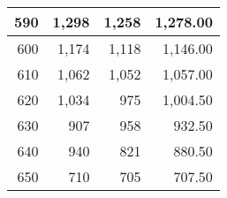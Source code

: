 \begin{longtable}{|r|r|r|r|}
		590                                                                                                                   & 1,298                                                & 1,258                                                & 1,278.00                                                                                                               \\ \hline
		600                                                                                                                   & 1,174                                                & 1,118                                                & 1,146.00                                                                                                               \\ \hline
		610                                                                                                                   & 1,062                                                & 1,052                                                & 1,057.00                                                                                                               \\ \hline
		620                                                                                                                   & 1,034                                                & 975                                                  & 1,004.50                                                                                                               \\ \hline
		630                                                                                                                   & 907                                                  & 958                                                  & 932.50                                                                                                                 \\ \hline
		640                                                                                                                   & 940                                                  & 821                                                  & 880.50                                                                                                                 \\ \hline
		650                                                                                                                   & 710                                                  & 705                                                  & 707.50                                                                                                                 \\ \hline

\end{longtable}
